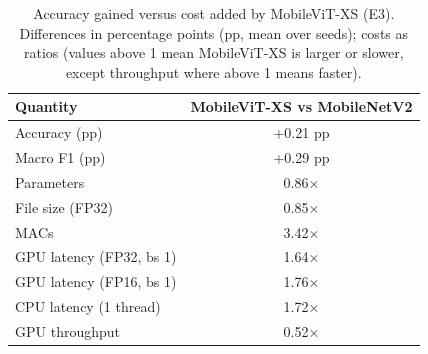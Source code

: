 \begin{table}[!t]
\centering
\footnotesize
\caption{Accuracy gained versus cost added by MobileViT-XS (E3). Differences in percentage points (pp, mean over seeds); costs as ratios (values above 1 mean MobileViT-XS is larger or slower, except throughput where above 1 means faster).}
\label{tab:tradeoff}
\begin{tabular}{lc}
\toprule
Quantity & MobileViT-XS vs MobileNetV2 \\
\midrule
Accuracy (pp) & +0.21 pp \\
Macro F1 (pp) & +0.29 pp \\
Parameters & 0.86$\times$ \\
File size (FP32) & 0.85$\times$ \\
MACs & 3.42$\times$ \\
GPU latency (FP32, bs 1) & 1.64$\times$ \\
GPU latency (FP16, bs 1) & 1.76$\times$ \\
CPU latency (1 thread) & 1.72$\times$ \\
GPU throughput & 0.52$\times$ \\
\bottomrule
\end{tabular}
\end{table}
